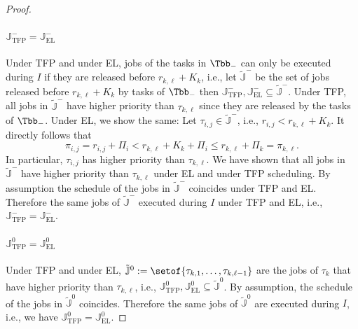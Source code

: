 \documentclass[conference]{IEEEtran}
\theoremstyle{definition}
\theoremstyle{remark}
\newcommand{\Jbb}{\mathbb{J}}
\DeclareMathOperator{\TFP}{TFP}
\DeclareMathOperator{\EL}{EL}
\begin{document}
\begin{proof}
 	\paragraph{$\Jbb_{\TFP}^- = \Jbb_{\EL}^-$}
 	Under TFP and under EL, jobs of the tasks in $\Tbb_{-}$ %
 	can only be executed during $I$ if they are released before $r_{k,\ell} + K_k$, 
 	i.e., let $\tilde{\Jbb}^-$ be the set of jobs released before $r_{k,\ell} + K_k$ by tasks of $\Tbb_{-}$ then 
 	$\Jbb_{\TFP}^-, \Jbb_{\EL}^- \subseteq \tilde{\Jbb}^-$.
 	Under TFP, all jobs in $\tilde{\Jbb}^-$ have higher priority than $\tau_{k,\ell}$ since they are released by the tasks of $\Tbb_{-}$.
 	Under EL, we show the same:
 	Let $\tau_{i,j} \in \tilde{\Jbb}^-$, i.e., $r_{i,j} < r_{k,\ell} + K_k$.
 	It directly follows that
 	\begin{equation}
 		\pi_{i,j} = r_{i,j} + \Pi_i 
 		< r_{k,\ell} + K_k + \Pi_i
 		\leq r_{k,\ell} + \Pi_k = \pi_{k,\ell}.
 	\end{equation}
	In particular, $\tau_{i,j}$ has higher priority than $\tau_{k,\ell}$.
	We have shown that all jobs in $\tilde{\Jbb}^-$ have higher priority than $\tau_{k,\ell}$ under EL and under TFP scheduling.
	By assumption the schedule of the jobs in $\tilde{\Jbb}^-$ coincides under TFP and EL.
	Therefore the same jobs of $\tilde{\Jbb}^-$ executed during $I$ under TFP and EL, i.e., $\Jbb_{\TFP}^- = \Jbb_{\EL}^-$.
	
	\paragraph{$\Jbb_{\TFP}^0 = \Jbb_{\EL}^0$}
	Under TFP and under EL, $\tilde{\Jbb}^0 := \setof{\tau_{k,1}, \dots, \tau_{k,\ell-1}}$ are the jobs of $\tau_k$ that have higher priority than $\tau_{k,\ell}$, i.e., $\Jbb_{\TFP}^0, \Jbb_{\EL}^0 \subseteq \tilde{\Jbb}^0$.
	By assumption, the schedule of the jobs in $\tilde{\Jbb}^0$ coincides.
	Therefore the same jobs of $\tilde{\Jbb}^0$ are executed during $I$, i.e., we have $\Jbb_{\TFP}^0 = \Jbb_{\EL}^0$.
	

\end{proof}
\end{document}

